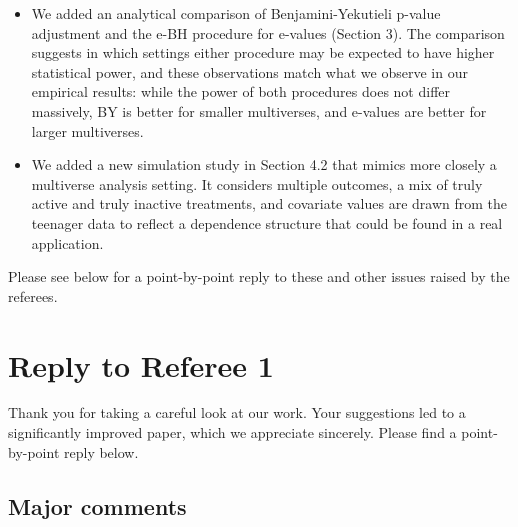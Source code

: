 \documentclass[11pt, a4paper]{article}
\begin{document}
\begin{enumerate}[leftmargin=*]
\begin{itemize}[leftmargin=*]
\item We added an analytical comparison of Benjamini-Yekutieli p-value adjustment and the e-BH procedure for e-values (Section 3). The comparison suggests in which settings either procedure may be expected to have higher statistical power, and these observations match what we observe in our empirical results: while the power of both procedures does not differ massively, BY is better for smaller multiverses, and e-values are better for larger multiverses.

\item We added a new simulation study in Section 4.2 that mimics more closely a multiverse analysis setting. It considers multiple outcomes, a mix of truly active and truly inactive treatments, and covariate values are drawn from the teenager data to reflect a dependence structure that could be found in a real application.
\end{itemize}

Please see below for a point-by-point reply to these and other issues raised by the referees.



\end{enumerate}



\section*{Reply to Referee 1}

Thank you for taking a careful look at our work. Your suggestions led to a significantly improved paper, which we appreciate sincerely. Please find a point-by-point reply below.

\subsection*{Major comments}
\end{document}
